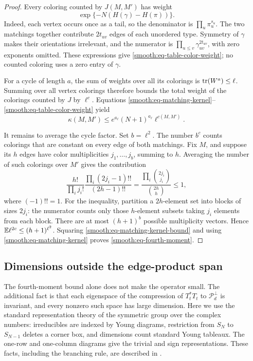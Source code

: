 \begin{proof}
Every coloring counted by \(J(M,M')\) has weight
\begin{equation}\label{smooth:eq-table-color-weight}
 \exp\{-N(H(\gamma)-H(\pi))\}.
\end{equation}
Indeed, each vertex occurs once as a tail, so the denominator is
\(\prod_u\pi_u^{s_u}\).  The two matchings together contribute
\(2t_{uv}\) edges of each unordered type.  Symmetry of \(\gamma\)
makes their orientations irrelevant, and the numerator is
\(\prod_{u\le v}\gamma_{uv}^{2t_{uv}}\), with zero exponents omitted.
These expressions give \eqref{smooth:eq-table-color-weight}; no counted
coloring uses a zero entry of \(\gamma\).

For a cycle of length \(a\), the sum of weights over all its colorings
is \(\operatorname{tr}(W^a)\le\ell\).  Summing over all vertex colorings therefore
bounds the total weight of the colorings counted by \(J\) by
\(\ell^c\).  Equations \eqref{smooth:eq-matching-kernel}--\eqref{smooth:eq-table-color-weight}
yield
\begin{equation}\label{smooth:eq-matching-kernel-bound}
 \kappa(M,M')\le e^{a_\ell}(N+1)^{a_\ell}\ell^{c(M,M')}.
\end{equation}

It remains to average the cycle factor.  Set \(b=\ell^2\).  The
number \(b^c\) counts colorings that are constant on every edge of
both matchings.  Fix \(M\), and suppose its \(h\) edges have color
multiplicities \(j_1,\ldots,j_b\), summing to \(h\).  Averaging the
number of such colorings over \(M'\) gives the contribution
\[
 \frac{h!}{\prod_i j_i!}
 \frac{\prod_i(2j_i-1)!!}{(2h-1)!!}
 =\frac{\prod_i\binom{2j_i}{j_i}}{\binom{2h}{h}}
 \le1,
\]
where \((-1)!!=1\).  For the inequality, partition a \(2h\)-element
set into blocks of sizes \(2j_i\): the numerator counts only those
\(h\)-element subsets taking \(j_i\) elements from each block.
There are at most \((h+1)^b\) possible multiplicity vectors.  Hence
\(\mathbb E\ell^{2c}\le(h+1)^{\ell^2}\).  Squaring
\eqref{smooth:eq-matching-kernel-bound} and using
\eqref{smooth:eq-matching-kernel} proves \eqref{smooth:eq-fourth-moment}.
\end{proof}

\subsection{Dimensions outside the edge-product span}

The fourth-moment bound alone does not make the operator small.
The additional fact is that each eigenspace of the compression of
\(T_t^*T_t\) to \(\mathcal P_d^\perp\) is invariant, and every nonzero
such space has large dimension.  Here we use the standard
representation theory of the symmetric group over the complex
numbers: irreducibles are indexed by Young diagrams, restriction
from \(S_N\) to \(S_{N-1}\) deletes a corner box, and dimensions count
standard Young tableaux.  The one-row and one-column diagrams give
the trivial and sign representations.  These facts, including the
branching rule, are described in
\cite[Theorem~5.8, Section~6, and Corollary~7.1]{vershik-okounkov}.

